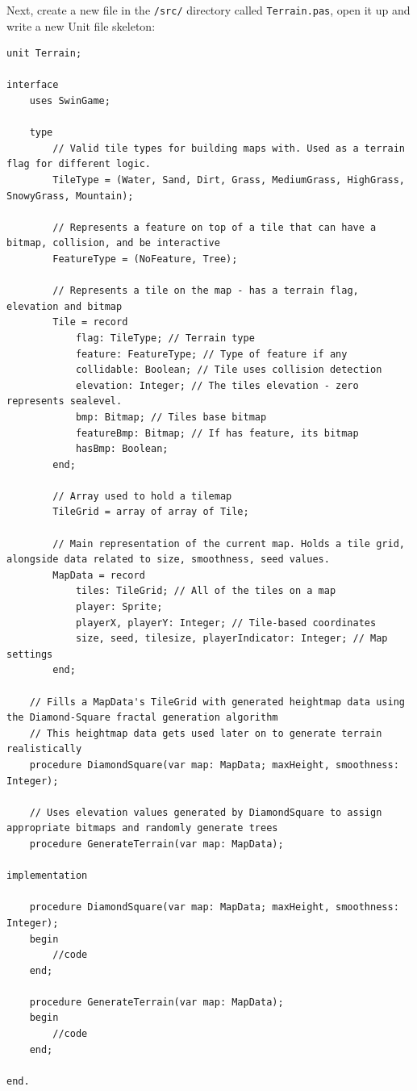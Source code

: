 \documentclass{article}
\begin{document}
Next, create a new file in the \texttt{/src/} directory called \texttt{Terrain.pas}, open it up and write a new Unit file skeleton:

\begin{mdframed}[topline=false,bottomline=false,backgroundcolor=darkgray]
\begin{verbatim}
unit Terrain;

interface
	uses SwinGame;

	type
		// Valid tile types for building maps with. Used as a terrain flag for different logic.
		TileType = (Water, Sand, Dirt, Grass, MediumGrass, HighGrass, SnowyGrass, Mountain);

		// Represents a feature on top of a tile that can have a bitmap, collision, and be interactive
		FeatureType = (NoFeature, Tree);

		// Represents a tile on the map - has a terrain flag, elevation and bitmap
		Tile = record
			flag: TileType; // Terrain type
			feature: FeatureType; // Type of feature if any
			collidable: Boolean; // Tile uses collision detection
			elevation: Integer; // The tiles elevation - zero represents sealevel.
			bmp: Bitmap; // Tiles base bitmap
			featureBmp: Bitmap; // If has feature, its bitmap
			hasBmp: Boolean;
		end;

		// Array used to hold a tilemap
		TileGrid = array of array of Tile;

		// Main representation of the current map. Holds a tile grid, alongside data related to size, smoothness, seed values.
		MapData = record
			tiles: TileGrid; // All of the tiles on a map
			player: Sprite;
			playerX, playerY: Integer; // Tile-based coordinates
			size, seed, tilesize, playerIndicator: Integer; // Map settings
		end;

	// Fills a MapData's TileGrid with generated heightmap data using the Diamond-Square fractal generation algorithm
	// This heightmap data gets used later on to generate terrain realistically
	procedure DiamondSquare(var map: MapData; maxHeight, smoothness: Integer);

	// Uses elevation values generated by DiamondSquare to assign appropriate bitmaps and randomly generate trees
	procedure GenerateTerrain(var map: MapData);
	
implementation

	procedure DiamondSquare(var map: MapData; maxHeight, smoothness: Integer);
	begin
		//code
	end;

	procedure GenerateTerrain(var map: MapData);
	begin
		//code
	end;

end.
\end{verbatim}
\end{mdframed}
\end{document}
